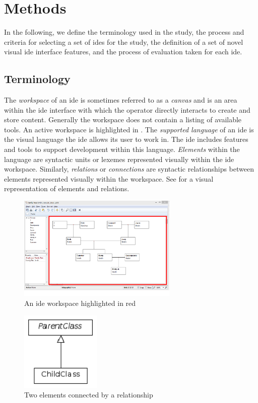 \section{Methods} \label{sec:methods}

In the following, we define the terminology used in the study, the process and criteria for selecting a set of \acp{ide} for the study, the definition of a set of novel visual \ac{ide} interface features, and the process of evaluation taken for each \ac{ide}.

\subsection{Terminology } \label{subsec:terminology}
The \emph{workspace} of an \ac{ide} is sometimes referred to as a
\emph{canvas} and is an area within the \ac{ide} interface with which the
operator directly interacts to create and store content. Generally the
workspace does not contain a listing of available tools. An active
workspace is highlighted in . The \emph{supported
language} of an \ac{ide} is the visual language the \ac{ide} allows its
user to work in. The \ac{ide} includes features and tools to support
development within this language.  \emph{Elements} within the language are
syntactic units or lexemes represented visually within the \ac{ide}
workspace. Similarly, \emph{relations} or \emph{connections} are syntactic
relationships between elements represented visually within the workspace.
\cite{costagliola2002} See  for a visual representation
of elements and relations.

\begin{figure}[!t]
\centering
\includegraphics[width=3in]{images/workspace}
\caption{An ide workspace highlighted in red}
\label{fig:workspace}
\end{figure}

\begin{figure}[!t]
\centering
\includegraphics[width=1.5in]{images/element}
\caption{Two elements connected by a relationship}
\label{fig:elements}
\end{figure}


